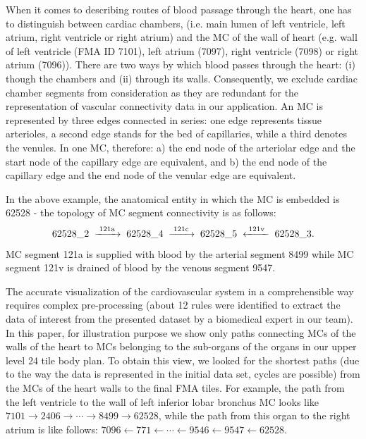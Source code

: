 When it comes to describing routes of blood passage through the heart, one has to distinguish between cardiac chambers, (i.e. main lumen of left ventricle, left atrium, right ventricle or right atrium) and the MC of the wall of heart (e.g. wall of left ventricle (FMA ID 7101), left atrium (7097), right ventricle (7098) or right atrium (7096)). There are two ways by which blood passes through the heart: (i) though the chambers and (ii) through its walls. Consequently, we exclude cardiac chamber segments from consideration as they are redundant for the representation of vascular connectivity data in our application.
An MC is represented by three edges connected in series: one edge represents tissue arterioles, a second edge stands for the bed of
capillaries, while a third denotes the venules. In one MC, therefore: a) the end node of the arteriolar edge and the start node of the
capillary edge are equivalent, and b) the end node of the capillary edge and the end node of the venular
edge are equivalent.

In the above example, the anatomical entity in which the MC is embedded is 62528 - the topology of MC segment connectivity is as follows:
\[
	62528\_2  \;\xrightarrow{\;\text{121a}\;}\;
	62528\_4  \;\xrightarrow{\;\text{121c}\;}\;
	62528\_5  \;\xleftarrow {\;\text{121v}\;}\;
	62528\_3  \text.
\]
MC segment 121a is supplied with blood by the arterial segment 8499 while MC segment 121v is drained of blood by the venous segment 9547.

The accurate visualization of the cardiovascular system in a comprehensible way requires complex pre-processing (about 12 rules were identified to extract the data of interest from the presented dataset by a biomedical expert in our team).
In this paper, for illustration purpose we show only paths connecting MCs of the walls of the heart to MCs belonging to the sub-organs of the organs in our upper level 24 tile body plan.
To obtain this view, we looked for the shortest paths (due to the way the data is represented in the initial data set, cycles are possible) from the MCs of the heart walls to the final FMA tiles. For example, the path from the left ventricle to the wall of left inferior lobar bronchus MC looks like 
{$7101 \rightarrow 2406 \rightarrow \cdots \rightarrow 8499 \rightarrow 62528$,}
while the path from this organ to the right atrium is like follows: 
{$7096 \leftarrow 771 \leftarrow \cdots \leftarrow 9546 \leftarrow 9547 \leftarrow 62528$.}

